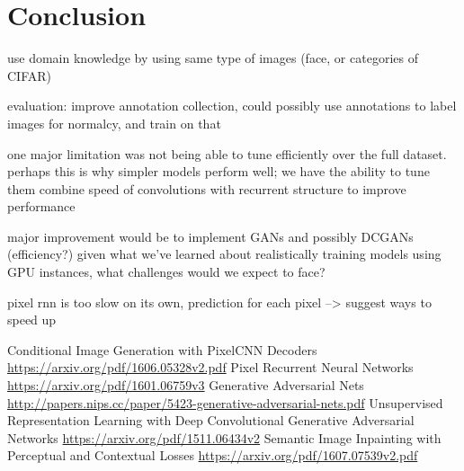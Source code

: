 \documentclass[10pt,twocolumn,letterpaper]{article}
\begin{document}
\section{Conclusion}



use domain knowledge by using same type of images (face, or categories of CIFAR)

evaluation: 
improve annotation collection, could possibly use annotations to label images for normalcy, and train on that

one major limitation was not being able to tune efficiently over the full dataset. 
perhaps this is why simpler models perform well; we have the ability to tune them
combine speed of convolutions with recurrent structure to improve performance

major improvement would be to implement GANs and possibly DCGANs (efficiency?) given what we've learned about realistically training models using GPU instances, what challenges would we expect to face?



pixel rnn is too slow on its own, prediction for each pixel --> suggest ways to speed up




\begin{thebibliography}{1}
 Conditional Image Generation with PixelCNN Decoders \url{https://arxiv.org/pdf/1606.05328v2.pdf}
 Pixel Recurrent Neural Networks \url{https://arxiv.org/pdf/1601.06759v3}
 Generative Adversarial Nets \url{http://papers.nips.cc/paper/5423-generative-adversarial-nets.pdf}
 Unsupervised Representation Learning with Deep Convolutional Generative Adversarial Networks \url{https://arxiv.org/pdf/1511.06434v2}
 Semantic Image Inpainting with Perceptual and Contextual Losses \url{https://arxiv.org/pdf/1607.07539v2.pdf}
\end{thebibliography}

%


\end{document}
